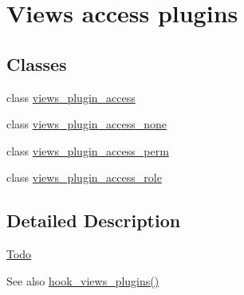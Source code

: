 \hypertarget{group__views__access__plugins}{
\section{Views access plugins}
\label{group__views__access__plugins}
}
\subsection*{Classes}
\begin{DoxyCompactItemize}
\item 
class \hyperlink{classviews__plugin__access}{views\_\-plugin\_\-access}
\item 
class \hyperlink{classviews__plugin__access__none}{views\_\-plugin\_\-access\_\-none}
\item 
class \hyperlink{classviews__plugin__access__perm}{views\_\-plugin\_\-access\_\-perm}
\item 
class \hyperlink{classviews__plugin__access__role}{views\_\-plugin\_\-access\_\-role}
\end{DoxyCompactItemize}


\subsection{Detailed Description}
\begin{Desc}
\item[\hyperlink{todo__todo000082}{Todo}]\end{Desc}
\begin{DoxySeeAlso}{See also}
\hyperlink{group__views__hooks_ga23f6e9972b2ed84fc54b7ff63f44477d}{hook\_\-views\_\-plugins()} 
\end{DoxySeeAlso}
